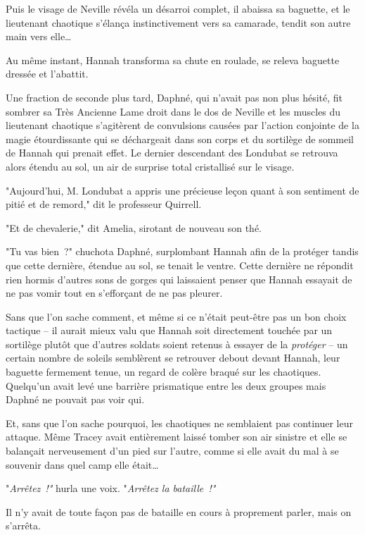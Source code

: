 Puis le visage de Neville révéla un désarroi complet, il abaissa sa baguette, et le lieutenant chaotique s'élança instinctivement vers sa camarade, tendit son autre main vers elle…

Au même instant, Hannah transforma sa chute en roulade, se releva baguette dressée et l'abattit.

Une fraction de seconde plus tard, Daphné, qui n'avait pas non plus hésité, fit sombrer sa Très Ancienne Lame droit dans le dos de Neville et les muscles du lieutenant chaotique s'agitèrent de convulsions causées par l'action conjointe de la magie étourdissante qui se déchargeait dans son corps et du sortilège de sommeil de Hannah qui prenait effet. Le dernier descendant des Londubat se retrouva alors étendu au sol, un air de surprise total cristallisé sur le visage.

\later

"Aujourd'hui, M. Londubat a appris une précieuse leçon quant à son sentiment de pitié et de remord," dit le professeur Quirrell.

"Et de chevalerie," dit Amelia, sirotant de nouveau son thé.

\later

"Tu vas bien~?" chuchota Daphné, surplombant Hannah afin de la protéger tandis que cette dernière, étendue au sol, se tenait le ventre. Cette dernière ne répondit rien hormis d'autres sons de gorges qui laissaient penser que Hannah essayait de ne pas vomir tout en s'efforçant de ne pas pleurer.

Sans que l'on sache comment, et même si ce n'était peut-être pas un bon choix tactique -- il aurait mieux valu que Hannah soit directement touchée par un sortilège plutôt que d'autres soldats soient retenus à essayer de la \emph{protéger} -- un certain nombre de soleils semblèrent se retrouver debout devant Hannah, leur baguette fermement tenue, un regard de colère braqué sur les chaotiques. Quelqu'un avait levé une barrière prismatique entre les deux groupes mais Daphné ne pouvait pas voir qui.

Et, sans que l'on sache pourquoi, les chaotiques ne semblaient pas continuer leur attaque. Même Tracey avait entièrement laissé tomber son air sinistre et elle se balançait nerveusement d'un pied sur l'autre, comme si elle avait du mal à se souvenir dans quel camp elle était…

"\emph{Arrêtez~!"} hurla une voix. "\emph{Arrêtez la bataille~!"}

Il n'y avait de toute façon pas de bataille en cours à proprement parler, mais on s'arrêta.

